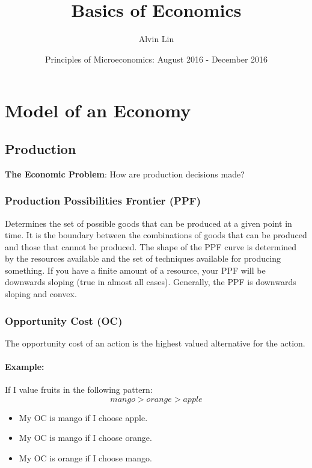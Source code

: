 \documentclass{article}
\title{Basics of Economics}
\author{Alvin Lin}
\date{Principles of Microeconomics: August 2016 - December 2016}
\begin{document}
\maketitle

\section{Model of an Economy}

\subsection{Production}
\textbf{The Economic Problem}: How are production decisions made?

\subsubsection{Production Possibilities Frontier (PPF)}
Determines the set of possible goods that can be produced at a given point in
time. It is the boundary between the combinations of goods that can be produced
and those that cannot be produced. The shape of the PPF curve is determined by
the resources available and the set of techniques available for producing
something. If you have a finite amount of a resource, your PPF will be
downwards sloping (true in almost all cases). Generally, the PPF is downwards
sloping and convex.

\subsubsection{Opportunity Cost (OC)}
The opportunity cost of an action is the highest valued alternative for
the action.

\paragraph{Example:} If I value fruits in the following pattern:
\[ mango > orange > apple \]
\begin{itemize}
  \item My OC is mango if I choose apple.
  \item My OC is mango if I choose orange.
  \item My OC is orange if I choose mango.
\end{itemize}
\end{document}

